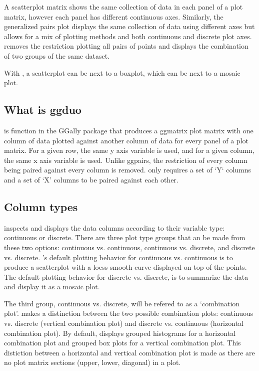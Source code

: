 \documentclass[article]{jss}
\begin{document}
    A scatterplot matrix shows the same collection of data in each panel of a plot matrix, however each panel has different continuous axes.
    Similarly, the generalized pairs plot displays the same collection of data using different axes but allows for a mix of plotting methods and both continuous and discrete plot axes.
     removes the restriction plotting all pairs of points and displays the combination of two groups of the same dataset.

    With , a scatterplot can be next to a boxplot, which can be next to a mosaic plot.

\subsection{What is ggduo}

 is function in the GGally package that produces a ggmatrix plot matrix with one column of data plotted against another column of data for every panel of a plot matrix.
For a given row, the same y axis variable is used, and for a given column, the same x axis variable is used.
Unlike ggpairs, the restriction of every column being paired against every column is removed.
 only requires a set of `Y` columns and a set of `X' columns to be paired against each other.



\subsection*{Column types}

 inspects and displays the data columns according to their variable type: continuous or discrete.
There are three plot type groups that an be made from these two options: continuous vs. continuous, continuous vs. discrete, and discrete vs. discrete.
's default plotting behavior for continuous vs. continuous is to produce a scatterplot with a loess smooth curve displayed on top of the points.
The default plotting behavior for discrete vs. discrete, is to summarize the data and display it as a mosaic plot.

The third group, continuous vs. discrete, will be refered to as a `combination plot'.
 makes a distinction between the two possible combination plots: continuous vs. discrete (vertical combination plot) and discrete vs. continuous (horizontal combination plot).
By default,  displays grouped histograms for a horizontal combination plot and grouped box plots for a vertical combination plot.
This distiction between a horizontal and vertical combination plot is made as there are no plot matrix sections (upper, lower, diagonal) in a  plot.
\end{document}
